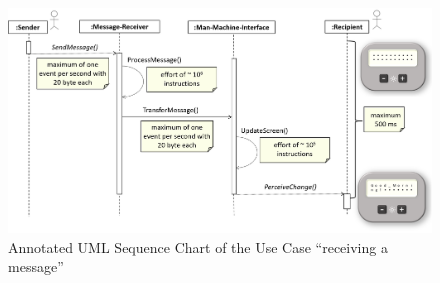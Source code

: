 \begin{figure}
    \centering
    \includegraphics[width=\columnwidth]{graphics/sequence_message.png}
    \caption{Annotated UML Sequence Chart of the Use Case ``receiving a message''}\label{fig:seq_message}
\end{figure}
